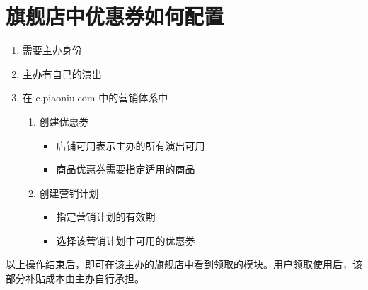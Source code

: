 \documentclass[11pt,a4paper]{article}
\begin{document}
\section{旗舰店中优惠券如何配置}
\label{sec:org406bca7}
\begin{enumerate}
\item 需要主办身份
\item 主办有自己的演出
\item 在 e.piaoniu.com 中的营销体系中
\begin{enumerate}
\item 创建优惠券
\begin{itemize}
\item 店铺可用表示主办的所有演出可用
\item 商品优惠券需要指定适用的商品
\end{itemize}
\item 创建营销计划
\begin{itemize}
\item 指定营销计划的有效期
\item 选择该营销计划中可用的优惠券
\end{itemize}
\end{enumerate}
\end{enumerate}

以上操作结束后，即可在该主办的旗舰店中看到领取的模块。用户领取使用后，该部分补贴成本由主办自行承担。
\end{document}
